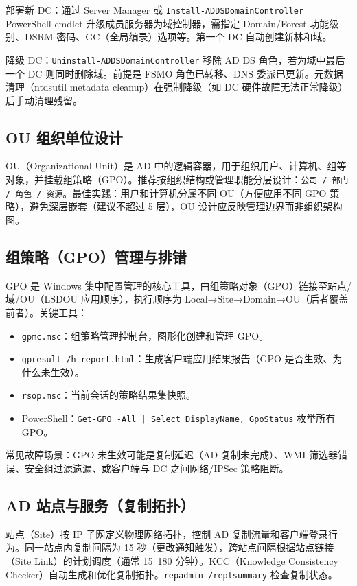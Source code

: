 \documentclass[12pt,UTF8]{ctexbook}
\begin{document}
部署新 DC：通过 Server Manager 或 \texttt{Install-ADDSDomainController} PowerShell cmdlet 升级成员服务器为域控制器，需指定 Domain/Forest 功能级别、DSRM 密码、GC（全局编录）选项等。第一个 DC 自动创建新林和域。

降级 DC：\texttt{Uninstall-ADDSDomainController} 移除 AD DS 角色，若为域中最后一个 DC 则同时删除域。前提是 FSMO 角色已转移、DNS 委派已更新。元数据清理（ntdsutil metadata cleanup）在强制降级（如 DC 硬件故障无法正常降级）后手动清理残留。

    \subsection{OU 组织单位设计}

OU（Organizational Unit）是 AD 中的逻辑容器，用于组织用户、计算机、组等对象，并挂载组策略（GPO）。推荐按组织结构或管理职能分层设计：\texttt{公司 / 部门 / 角色 / 资源}。最佳实践：用户和计算机分属不同 OU（方便应用不同 GPO 策略），避免深层嵌套（建议不超过 5 层），OU 设计应反映管理边界而非组织架构图。

    \subsection{组策略（GPO）管理与排错}

GPO 是 Windows 集中配置管理的核心工具，由组策略对象（GPO）链接至站点/域/OU（LSDOU 应用顺序），执行顺序为 Local→Site→Domain→OU（后者覆盖前者）。关键工具：
\begin{itemize}
	\item \texttt{gpmc.msc}：组策略管理控制台，图形化创建和管理 GPO。
	\item \texttt{gpresult /h report.html}：生成客户端应用结果报告（GPO 是否生效、为什么未生效）。
	\item \texttt{rsop.msc}：当前会话的策略结果集快照。
	\item PowerShell：\texttt{Get-GPO -All | Select DisplayName, GpoStatus} 枚举所有 GPO。
\end{itemize}

常见故障场景：GPO 未生效可能是复制延迟（AD 复制未完成）、WMI 筛选器错误、安全组过滤遗漏、或客户端与 DC 之间网络/IPSec 策略阻断。

    \subsection{AD 站点与服务（复制拓扑）}

站点（Site）按 IP 子网定义物理网络拓扑，控制 AD 复制流量和客户端登录行为。同一站点内复制间隔为 15 秒（更改通知触发），跨站点间隔根据站点链接（Site Link）的计划调度（通常 15~180 分钟）。KCC（Knowledge Consistency Checker）自动生成和优化复制拓扑。\texttt{repadmin /replsummary} 检查复制状态。
\end{document}
